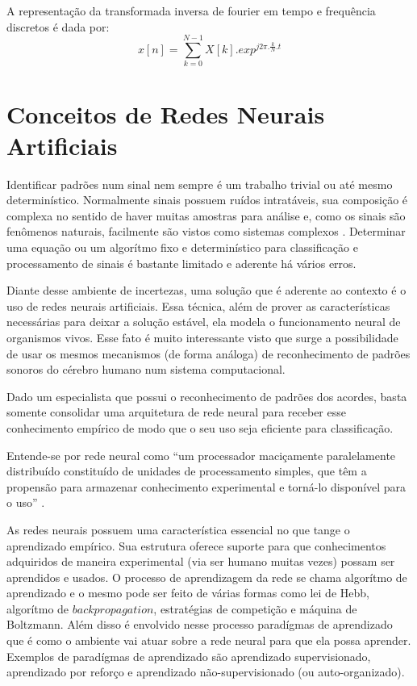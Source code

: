 A representação da transformada inversa de fourier em tempo e frequência discretos é dada por:
\begin{equation}
\label{eqn13}
	x[n] = \sum_{k=0}^{N - 1}{X[k].{exp}^{j2\pi.\frac{k}{N}.t}}
\end{equation}


\section{Conceitos de Redes Neurais Artificiais}
\label{sec:conceitosredesneurais}

Identificar padrões num sinal nem sempre é um trabalho trivial ou até mesmo determinístico. Normalmente sinais possuem ruídos intratáveis, sua composição é complexa no sentido de haver muitas amostras para análise e, como os sinais são fenômenos naturais, facilmente são vistos como sistemas complexos \cite{morin}. Determinar uma equação ou um algorítmo fixo e determinístico para classificação e processamento de sinais é bastante limitado e aderente há vários erros.

Diante desse ambiente de incertezas, uma solução que é aderente ao contexto é o uso de redes neurais artificiais. Essa técnica, além de prover as características necessárias para deixar a solução estável, ela modela o funcionamento neural de organismos vivos. Esse fato é muito interessante visto que surge a possibilidade de usar os mesmos mecanismos (de forma análoga) de reconhecimento de padrões sonoros do cérebro humano num sistema computacional.

Dado um especialista que possui o reconhecimento de padrões dos acordes, basta somente consolidar uma arquitetura de rede neural para receber esse conhecimento empírico de modo que o seu uso seja eficiente para classificação.

Entende-se por rede neural como ``um processador maciçamente paralelamente distribuído constituído de unidades de processamento simples, que têm a propensão para armazenar conhecimento experimental e torná-lo disponível para o uso'' \cite{haykin2009neural}. 

As redes neurais possuem uma característica essencial no que tange o aprendizado empírico. Sua estrutura oferece suporte para que conhecimentos adquiridos de maneira experimental (via ser humano muitas vezes) possam ser aprendidos e usados. O processo de aprendizagem da rede se chama algorítmo de aprendizado e o mesmo pode ser feito de várias formas como lei de Hebb, algorítmo de $backpropagation$, estratégias de competição e máquina de Boltzmann. Além disso é envolvido nesse processo paradígmas de aprendizado que é como o ambiente vai atuar sobre a rede neural para que ela possa aprender. Exemplos de paradígmas de aprendizado são aprendizado supervisionado, aprendizado por reforço e aprendizado não-supervisionado (ou auto-organizado).

